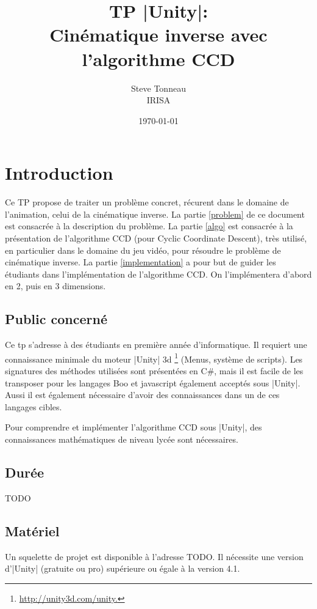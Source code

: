 \documentclass{article}
\title{TP |Unity|: \\ Cin\'ematique inverse avec l'algorithme CCD }
\date{\today}
\author{Steve Tonneau\\ IRISA}
\begin{document}
\maketitle

\section*{Introduction}
Ce TP propose de traiter un probl\`eme concret, r\'ecurent dans le domaine de l'animation, celui de la 
cin\'ematique inverse. La partie \ref{problem} de ce document est consacr\'ee \`a la description du probl\`eme. La
partie \ref{algo} est consacr\'ee \`a la pr\'esentation de l'algorithme CCD (pour Cyclic Coordinate Descent), tr\`es utilis\'e,
en particulier dans le domaine du jeu vid\'eo, pour r\'esoudre le probl\`eme de cin\'ematique inverse.
La partie \ref{implementation} a pour 
but de guider les \'etudiants dans l'impl\'ementation de l'algorithme CCD.
On l'impl\'ementera d'abord en 2, puis en 3 dimensions.

\subsection*{Public concern\'e}
Ce tp s'adresse \`a des \'etudiants en premi\`ere ann\'ee d'informatique. Il requiert une connaissance
minimale du moteur |Unity| 3d \footnote{\href{http://unity3d.com/unity}{http://unity3d.com/unity.}} (Menus, syst\`eme de scripts).
Les signatures des m\'ethodes utilis\'ees sont pr\'esent\'ees en C\#, mais il est facile de les transposer pour les langages Boo et javascript
\'egalement accept\'es sous |Unity|. Aussi il est \'egalement n\'ecessaire d'avoir des connaissances dans un de ces langages cibles.

Pour comprendre et impl\'ementer l'algorithme CCD sous |Unity|, des connaissances math\'ematiques de niveau lyc\'ee sont n\'ecessaires.

\subsection*{Dur\'ee}
TODO 

\subsection*{Mat\'eriel}
Un squelette de projet est disponible \`a l'adresse TODO. Il n\'ecessite une version d'|Unity| (gratuite ou pro) sup\'erieure ou \'egale \`a la version 4.1. \\
\end{document}
